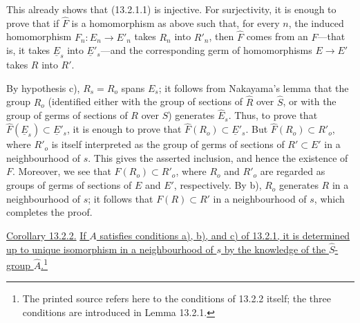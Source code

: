 \noindent
This already shows that (13.2.1.1) is injective. For surjectivity, it is
enough to prove that if $\widehat F$ is a homomorphism as above such that,
for every $n$, the induced homomorphism
$F_n:E_n\longrightarrow E'_n$ takes $R_n$ into $R'_n$, then
$\widehat F$ comes from an $F$---that is, it takes $\underline E_s$ into
$\underline E'_s$---and the corresponding germ of homomorphisms
$E\longrightarrow E'$ takes $R$ into $R'$.

By hypothesis c), $R_s=R_o$ spans $E_s$; it follows from Nakayama's
lemma that the group $R_o$ (identified either with the group of sections
of $\widehat R$ over $\widehat S$, or with the group of germs of sections
of $R$ over $S$) generates $\widehat E_s$. Thus, to prove that
$\widehat F(\underline E_s)\subset\underline E'_s$, it is enough to prove
that $\widehat F(R_o)\subset\underline E'_s$. But
$\widehat F(R_o)\subset R'_o$, where $R'_o$ is itself interpreted as the
group of germs of sections of $R'\subset E'$ in a neighbourhood of $s$.
This gives the asserted inclusion, and hence the existence of $F$.
Moreover, we see that $F(R_o)\subset R'_o$, where $R_o$ and $R'_o$ are
regarded as groups of germs of sections of $E$ and $E'$, respectively.
By b), $R_o$ generates $R$ in a neighbourhood of $s$; it follows that
$F(R)\subset R'$ in a neighbourhood of $s$, which completes the proof.

\medskip
\noindent
\underline{Corollary 13.2.2.} \underline{If $A$ satisfies conditions
a), b), and c) of 13.2.1, it is determined up to unique isomorphism in a
neighbourhood of $s$ by the knowledge of the $\widehat S$-group
$\widehat A$.}\footnote{The printed source refers here to the conditions
of 13.2.2 itself; the three conditions are introduced in Lemma 13.2.1.}
